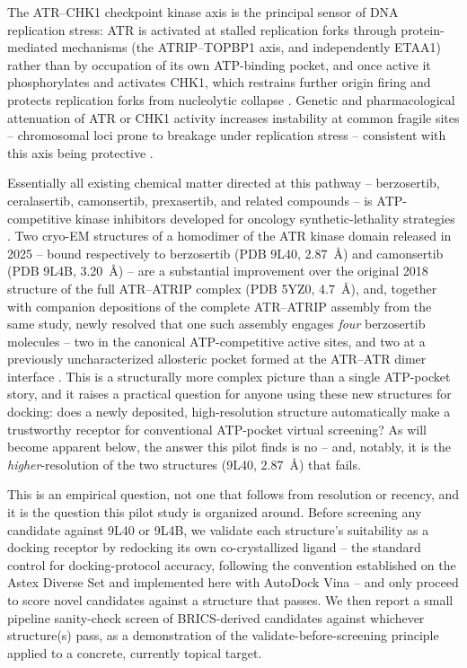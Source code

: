 \documentclass[11pt]{article}
\begin{document}
The ATR--CHK1 checkpoint kinase axis is the principal sensor of DNA
replication stress: ATR is activated at stalled replication forks through
protein-mediated mechanisms (the ATRIP--TOPBP1 axis, and independently
ETAA1) rather than by occupation of its own ATP-binding pocket, and once
active it phosphorylates and activates CHK1, which restrains further origin
firing and protects replication forks from nucleolytic collapse
\citep{kumagai2006,bass2016,saldivar2017}. Genetic and pharmacological
attenuation of ATR or CHK1 activity increases instability at common fragile
sites -- chromosomal loci prone to breakage under replication stress --
consistent with this axis being protective \citep{casper2002,debatisse2012}.

Essentially all existing chemical matter directed at this pathway --
berzosertib, ceralasertib, camonsertib, prexasertib, and related compounds
-- is ATP-competitive kinase inhibitors developed for oncology
synthetic-lethality strategies \citep{fokas2012}. Two cryo-EM structures of
a homodimer of the ATR kinase domain released in 2025 -- bound respectively
to berzosertib (PDB 9L40, 2.87~{\AA}) and camonsertib (PDB 9L4B,
3.20~{\AA}) -- are a substantial improvement over the original 2018
structure of the full ATR--ATRIP complex (PDB 5YZ0, 4.7~{\AA}), and,
together with companion depositions of the complete ATR--ATRIP assembly
from the same study, newly resolved that one such assembly engages
\emph{four} berzosertib molecules -- two in the canonical ATP-competitive
active sites, and two at a previously uncharacterized allosteric pocket
formed at the ATR--ATR dimer interface \citep{wang2025}. This is a
structurally more complex picture than a single ATP-pocket story, and it
raises a practical question for anyone using these new structures for
docking: does a newly deposited, high-resolution structure automatically
make a trustworthy receptor for conventional ATP-pocket virtual screening?
As will become apparent below, the answer this pilot finds is no -- and,
notably, it is the \emph{higher}-resolution of the two structures (9L40,
2.87~{\AA}) that fails.

This is an empirical question, not one that follows from resolution or
recency, and it is the question this pilot study is organized around. Before
screening any candidate against 9L40 or 9L4B, we validate each structure's
suitability as a docking receptor by redocking its own co-crystallized
ligand -- the standard control for docking-protocol accuracy, following the
convention established on the Astex Diverse Set \citep{hartshorn2007} and
implemented here with AutoDock Vina \citep{trott2010} -- and only proceed to
score novel candidates against a structure that passes. We then report a
small pipeline sanity-check screen of BRICS-derived \citep{degen2008}
candidates against whichever structure(s) pass, as a demonstration of the
validate-before-screening principle applied to a concrete, currently topical
target.
\end{document}
